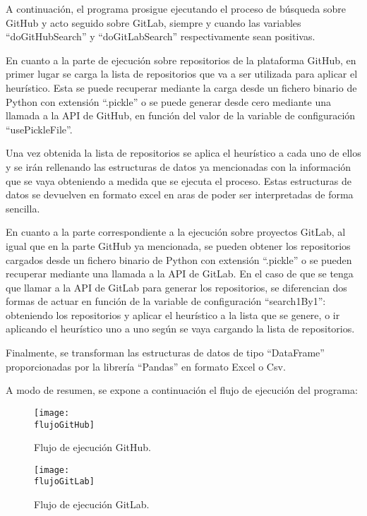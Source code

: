 A continuación, el programa prosigue ejecutando el proceso de búsqueda sobre GitHub y acto seguido sobre GitLab, siempre y cuando las variables ``doGitHubSearch'' y ``doGitLabSearch'' respectivamente sean positivas.

En cuanto a la parte de ejecución sobre repositorios de la plataforma GitHub, en primer lugar se carga la lista de repositorios que va a ser utilizada para aplicar el heurístico. Esta se puede recuperar mediante la carga desde un fichero binario de Python con extensión ``.pickle'' o se puede generar desde cero mediante una llamada a la API de GitHub, en función del valor de la variable de configuración ``usePickleFile''.

Una vez obtenida la lista de repositorios se aplica el heurístico a cada uno de ellos y se irán rellenando las estructuras de datos ya mencionadas con la información que se vaya obteniendo a medida que se ejecuta el proceso. Estas estructuras de datos se devuelven en formato excel en aras de poder ser interpretadas de forma sencilla.

En cuanto a la parte correspondiente a la ejecución sobre proyectos GitLab, al igual que en la parte GitHub ya mencionada, se pueden obtener los repositorios cargados desde un fichero binario de Python con extensión ``.pickle'' o se pueden recuperar mediante una llamada a la API de GitLab. En el caso de que se tenga que llamar a la API de GitLab para generar los repositorios, se diferencian dos formas de actuar en función de la variable de configuración ``search1By1'': obteniendo los repositorios y aplicar el heurístico a la lista que se genere, o ir aplicando el heurístico uno a uno según se vaya cargando la lista de repositorios.

Finalmente, se transforman las estructuras de datos de tipo ``DataFrame'' proporcionadas por la librería ``Pandas'' en formato Excel o Csv.

A modo de resumen, se expone a continuación el flujo de ejecución del programa:

\begin{figure}[h!]
    \centering
    \texttt{[image: \\flujoGitHub]}
    \caption{Flujo de ejecución GitHub.}
\end{figure}

\begin{figure}[h!]
    \centering
    \texttt{[image: \\flujoGitLab]}
    \caption{Flujo de ejecución GitLab.}
\end{figure}

